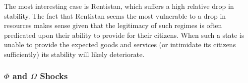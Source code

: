 \documentclass[12pt]{article}
\begin{document}
\begin{spacing}{1.5}

The most interesting case is Rentistan, which suffers a high relative drop in stability. The fact that Rentistan seems the most vulnerable to a drop in resources makes sense given that the legitimacy of such regimes is often predicated upon their ability to provide for their citizens. When such a state is unable to provide the expected goods and services (or intimidate its citizens sufficiently) its stability will likely deteriorate. 














\subsubsection{$\Phi$ and $\Omega$ Shocks} 


\end{spacing}
\end{document}
